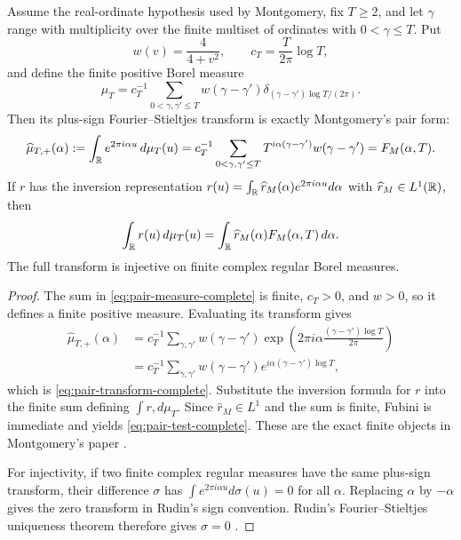 \begin{theorem}
\label{thm:weighted-pair-measure-complete}
Assume the real-ordinate hypothesis used by Montgomery, fix $T\geq2$, and let
$\gamma$ range with multiplicity over the finite multiset of ordinates with
$0<\gamma\leq T$.  Put
\[
 w(v)=\frac4{4+v^2},\qquad
 c_T=\frac{T}{2\pi}\log T,
\]
and define the finite positive Borel measure
\begin{equation}
 \mu_T=c_T^{-1}\sum_{0<\gamma,\gamma'\leq T}
 w(\gamma-\gamma')
 \delta_{(\gamma-\gamma')\log T/(2\pi)}.
 \label{eq:pair-measure-complete}
\end{equation}
Then its plus-sign Fourier--Stieltjes transform is exactly Montgomery's pair
form:
\begin{equation}
 \widehat\mu_{T,+}(\alpha)
 :=\int_\mathbb R e^{2\pi i\alpha u}\,d\mu_T(u)
 =c_T^{-1}\sum_{0<\gamma,\gamma'\leq T}
 T^{i\alpha(\gamma-\gamma')}w(\gamma-\gamma')
 =F_M(\alpha,T).
 \label{eq:pair-transform-complete}
\end{equation}
If $r$ has the inversion representation
$r(u)=\int_\mathbb R\widehat r_M(\alpha)e^{2\pi i\alpha u}d\alpha$ with
$\widehat r_M\in L^1(\mathbb R)$, then
\begin{equation}
 \int_\mathbb R r(u)\,d\mu_T(u)
 =\int_\mathbb R\widehat r_M(\alpha)F_M(\alpha,T)\,d\alpha.
 \label{eq:pair-test-complete}
\end{equation}
The full transform is injective on finite complex regular Borel measures.
\end{theorem}

\begin{proof}
The sum in \eqref{eq:pair-measure-complete} is finite, $c_T>0$, and $w>0$,
so it defines a finite positive measure.  Evaluating its transform gives
\begin{align*}
 \widehat\mu_{T,+}(\alpha)
 &=c_T^{-1}\sum_{\gamma,\gamma'}w(\gamma-\gamma')
 \exp\!\left(2\pi i\alpha
 \frac{(\gamma-\gamma')\log T}{2\pi}\right)\\
 &=c_T^{-1}\sum_{\gamma,\gamma'}w(\gamma-\gamma')
 e^{i\alpha(\gamma-\gamma')\log T},
\end{align*}
which is \eqref{eq:pair-transform-complete}.  Substitute the inversion formula
for $r$ into the finite sum defining $\int r,d\mu_T$.  Since
$\widehat r_M\in L^1$ and the sum is finite, Fubini is immediate and yields
\eqref{eq:pair-test-complete}.  These are the exact finite objects in
Montgomery's paper
\cite[pp.~181--182, eqs.~(2)--(6)]{montgomery1973}.

For injectivity, if two finite complex regular measures have the same plus-sign
transform, their difference $\sigma$ has
$\int e^{2\pi i\alpha u}d\sigma(u)=0$ for all $\alpha$.  Replacing $\alpha$ by
$-\alpha$ gives the zero transform in Rudin's sign convention.  Rudin's
Fourier--Stieltjes uniqueness theorem therefore gives $\sigma=0$
\cite[p.~29, Thm.~1.7.3(b)]{rudin1990}.
\end{proof}

